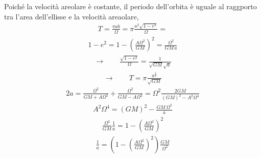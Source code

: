 \documentclass[letterpaper,10pt,italian]{jupyterBook}
\begin{document}
\sphinxAtStartPar
Poiché la velocità areolare è costante, il periodo dell’orbita è uguale al raggporto tra l’area dell’ellisse e la velocità areaolare,
\begin{equation*}
\begin{split}T = \frac{\pi a b}{\Omega} = \pi \frac{a^2 \sqrt{1-e^2}}{\Omega} = \end{split}
\end{equation*}\begin{equation*}
\begin{split}1-e^2 = 1 - \left(\frac{A \Omega^2}{GM} \right)^2 = \frac{\Omega^2}{GM \, a} \end{split}
\end{equation*}\begin{equation*}
\begin{split}\rightarrow \qquad \frac{\sqrt{1-e^2}}{\Omega} = \frac{1}{\sqrt{GM} \sqrt{a}}\end{split}
\end{equation*}\begin{equation*}
\begin{split}\rightarrow \qquad T = \pi \frac{a^{\frac{3}{2}}}{\sqrt{GM}}\end{split}
\end{equation*}\begin{equation*}
\begin{split}
 2a = \frac{\Omega^2}{GM+A \Omega^2} + \frac{\Omega^2}{GM-A \Omega^2} 
    = \Omega^2 \frac{2 GM }{(GM)^2 - A^2 \Omega^4}
\end{split}
\end{equation*}\begin{equation*}
\begin{split}A^2 \Omega^4 = (GM)^2 - \frac{GM \, \Omega^2}{a}\end{split}
\end{equation*}\begin{equation*}
\begin{split}\frac{\Omega^2}{GM}\frac{1}{a} = 1 - \left(\frac{A \Omega^2}{GM}\right)^2\end{split}
\end{equation*}\begin{equation*}
\begin{split}\frac{1}{a} = \left( 1 - \left(\frac{A \Omega^2}{GM}\right)^2 \right) \frac{GM}{\Omega^2}\end{split}
\end{equation*}


\sphinxstepscope
\end{document}
